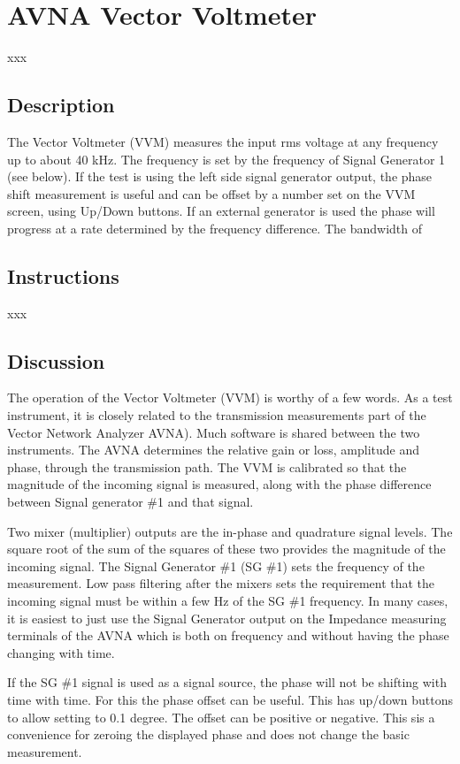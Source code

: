 \section{AVNA Vector Voltmeter}
xxx
\subsection{Description}
The Vector Voltmeter (VVM) measures the input rms voltage at any frequency up to about 40 kHz.  The frequency is set by the frequency of Signal Generator 1 (see below).  If the test is using the left side signal generator output, the phase shift measurement is useful and can be offset by a number set on the VVM screen, using Up/Down buttons.  If an external generator is used the phase will progress at a rate determined by the frequency difference.  The bandwidth of
\subsection{Instructions}
xxx
\subsection{Discussion}
The operation of the Vector Voltmeter (VVM) is worthy of a few words. As a test instrument, it is closely related to the transmission measurements part of the Vector Network Analyzer AVNA). Much software is shared between the two instruments. The AVNA determines the relative gain or loss, amplitude and phase, through the transmission path. The VVM is calibrated so that the magnitude of the incoming signal is measured, along with the phase difference between Signal generator \#1 and that signal.

Two mixer (multiplier) outputs are the in-phase and quadrature signal levels. The square root of the sum of the squares of these two provides the magnitude of the incoming signal. The Signal Generator \#1 (SG \#1) sets the frequency of the measurement. Low pass filtering after the mixers sets the requirement that the incoming signal must be within a few Hz of the SG \#1 frequency. In many cases, it is easiest to just use the Signal Generator output on the Impedance measuring terminals of the AVNA which is both on frequency and without having the phase changing with time.

If the SG \#1 signal is used as a signal source, the phase will not be shifting with time with time. For this the phase offset can be useful. This has up/down buttons to allow setting to 0.1 degree. The offset can be positive or negative. This sis a convenience for zeroing the displayed phase and does not change the basic measurement.

